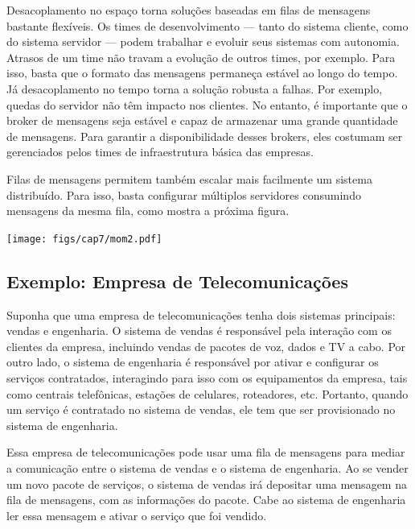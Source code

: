 \documentclass[
  11pt,
  twoside]{book}
\let\origfigure\figure
\let\endorigfigure\endfigure
\renewenvironment{figure}[1][2] {
    \expandafter\origfigure\expandafter[!h]
} {
    \endorigfigure
}
\begin{document}
Desacoplamento no espaço torna soluções baseadas em filas de mensagens
bastante flexíveis. Os times de desenvolvimento --- tanto do sistema
cliente, como do sistema servidor --- podem trabalhar e evoluir seus
sistemas com autonomia. Atrasos de um time não travam a evolução de
outros times, por exemplo. Para isso, basta que o formato das mensagens
permaneça estável ao longo do tempo. Já desacoplamento no tempo torna a
solução robusta a falhas. Por exemplo, quedas do servidor não têm
impacto nos clientes. No entanto, é importante que o broker de mensagens
seja estável e capaz de armazenar uma grande quantidade de mensagens.
Para garantir a disponibilidade desses brokers, eles costumam ser
gerenciados pelos times de infraestrutura básica das empresas.

Filas de mensagens permitem também escalar mais facilmente um sistema
distribuído. Para isso, basta configurar múltiplos servidores consumindo
mensagens da mesma fila, como mostra a próxima figura.

\begin{figure}
\centering
\texttt{[image: figs/cap7/mom2.pdf]}
\caption{Fila de Mensagens com vários consumidores.}
\end{figure}

\hypertarget{exemplo-empresa-de-telecomunicauxe7uxf5es}{%
\subsection{Exemplo: Empresa de
Telecomunicações}\label{exemplo-empresa-de-telecomunicauxe7uxf5es}}

Suponha que uma empresa de telecomunicações tenha dois sistemas
principais: vendas e engenharia. O sistema de vendas é responsável pela
interação com os clientes da empresa, incluindo vendas de pacotes de
voz, dados e TV a cabo. Por outro lado, o sistema de engenharia é
responsável por ativar e configurar os serviços contratados, interagindo
para isso com os equipamentos da empresa, tais como centrais
telefônicas, estações de celulares, roteadores, etc. Portanto, quando um
serviço é contratado no sistema de vendas, ele tem que ser provisionado
no sistema de engenharia.

Essa empresa de telecomunicações pode usar uma fila de mensagens para
mediar a comunicação entre o sistema de vendas e o sistema de
engenharia. Ao se vender um novo pacote de serviços, o sistema de vendas
irá depositar uma mensagem na fila de mensagens, com as informações do
pacote. Cabe ao sistema de engenharia ler essa mensagem e ativar o
serviço que foi vendido.
\end{document}

